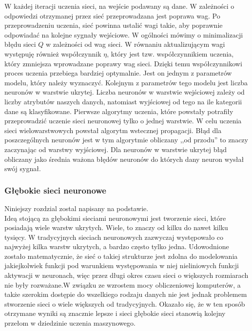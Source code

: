 
W każdej iteracji uczenia sieci, na wejście podawany są dane. W zależności o odpowiedzi otrzymanej przez sieć przeprowadzana jest poprawa wag. Po przeprowadzeniu uczenia, sieć powinna ustalić wagi takie, aby poprawnie odpowiadać na kolejne sygnały wejściowe. W ogólności mówimy o minimalizacji błędu sieci $Q$ w zależności od wag sieci. W równaniu aktualizującym wagi występuję również współczynnik $\eta$, który jest tzw. współczynnikiem uczenia, który zmniejsza wprowadzane poprawy wag sieci. Dzięki temu współczynnikowi proces uczenia przebiega bardziej optymalnie. Jest on jednym z parametrów modelu, który należy wyznaczyć. Kolejnym z parametrów tego modelu jest liczba neuronów w warstwie ukrytej. Liczba neuronów w warstwie wejściowej zależy od liczby atrybutów naszych danych, natomiast wyjściowej od tego na ile kategorii dane są klasyfikowane. Pierwsze algorytmy uczenia, które powstały potrafiły przeprowadzić uczenie sieci neuronowej tylko o jednej warstwie. W celu uczenia sieci wielowarstwowych powstał algorytm wstecznej propagacji. Błąd dla poszczególnych neuronów jest w tym algorytmie obliczany ,,od przodu'' to znaczy zaczynając od warstwy wyjściowej. Dla neuronów w warstwie ukrytej błąd obliczany jako średnia ważona błędów neuronów do których dany neuron wysłał swój sygnał.
\subsubsection{Głębokie sieci neuronowe}
Niniejszy rozdzial zostal napisany na podstawie\cite{dnn1}.\\
Ideą stojącą za głębokimi sieciami neuronowymi jest tworzenie sieci, które posiadają wiele warstw ukrytych. Wiele, to znaczy od kilku do nawet kilku tysięcy. W tradycyjnych sieciach neuronowych zazwyczaj występowało co najwyżej kilka warstw ukrytych, a bardzo często tylko jedna. Udowodnione zostało matematycznie, że sieć o takiej strukturze jest zdolna do modelowania jakiejkolwiek funkcji pod warunkiem występowania w niej nieliniowych funkcji aktywacji w neuronach, więc przez długi okres czasu sieci o większych rozmiarach nie były rozważane.W związku ze wzrostem mocy obliczeniowej komputerów, a także szerokim dostępie do wszelkiego rodzaju danych nie jest jednak problemem stworzenie sieci o wiele większych od tradycyjnych. Okazało się, że w ten sposób otrzymane wyniki są znacznie lepsze i sieci głębokie sieci stanowią kolejny przełom w dziedzinie uczenia maszynowego.

